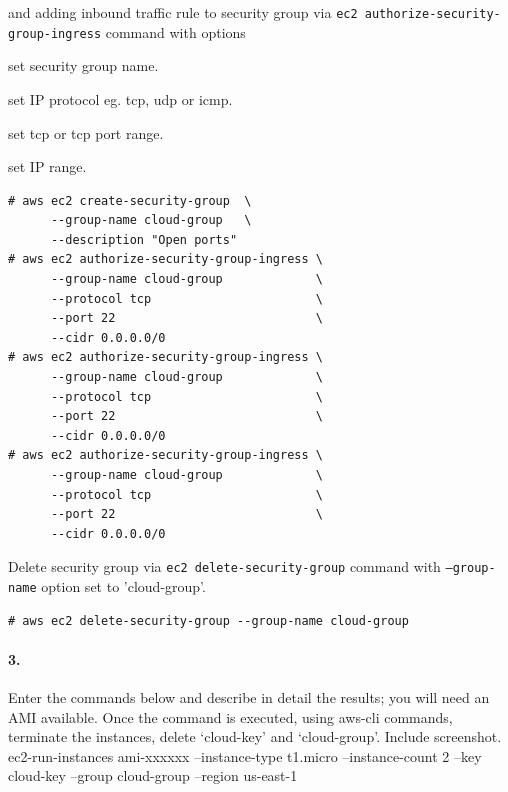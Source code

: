 \documentclass[a4paper]{article}
\begin{document}
and adding inbound traffic rule to security group via \texttt{ec2 authorize-security-group-ingress} command with options
\begin{description}
\leftskip 0.4in
\parindent -0.4in
	\item[\texttt{--group-name} : ] set security group name.
	\item[\texttt{--protocol} : ] set IP protocol eg. tcp, udp or icmp.
	\item[\texttt{--port} : ] set tcp or tcp port range.
	\item[\texttt{-cidr} : ] set IP range.
\end{description}
\begin{verbatim}
# aws ec2 create-security-group  \
      --group-name cloud-group   \
      --description "Open ports"
# aws ec2 authorize-security-group-ingress \
      --group-name cloud-group             \
      --protocol tcp                       \
      --port 22                            \
      --cidr 0.0.0.0/0
# aws ec2 authorize-security-group-ingress \
      --group-name cloud-group             \
      --protocol tcp                       \
      --port 22                            \
      --cidr 0.0.0.0/0
# aws ec2 authorize-security-group-ingress \
      --group-name cloud-group             \
      --protocol tcp                       \
      --port 22                            \
      --cidr 0.0.0.0/0
\end{verbatim}

Delete security group via \texttt{ec2 delete-security-group} command with \texttt{--group-name} option set to 'cloud-group'.

\begin{verbatim}
# aws ec2 delete-security-group --group-name cloud-group
\end{verbatim}

\paragraph{3. } Enter the commands below and describe in detail the results; you will need an AMI available. Once the command is executed, using aws-cli commands, terminate the instances, delete ‘cloud-key’ and ‘cloud-group’. Include screenshot. \\
ec2-run-instances ami-xxxxxx --instance-type t1.micro --instance-count 2  --key cloud-key  --group cloud-group  --region us-east-1
\end{document}
